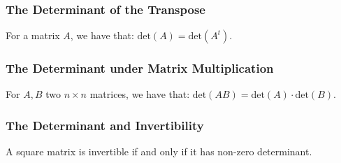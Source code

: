 \subsubsection{The Determinant of the Transpose}

For a matrix $A$, we have that: $\text{det}(A) = \text{det}(A^t).$

\subsubsection{The Determinant under Matrix Multiplication}

For $A, B$ two $n \times n$ matrices, we have that:
$\text{det}(AB) = \text{det}(A)\cdot\text{det}(B).$

\subsubsection{The Determinant and Invertibility}

A square matrix is invertible if and only if it has non-zero determinant.